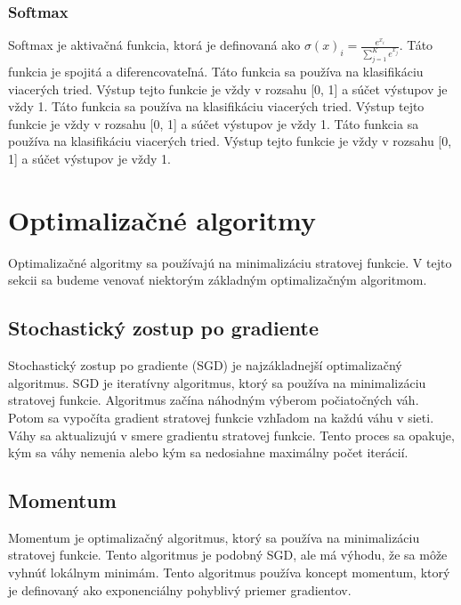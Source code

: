 \subsubsection{Softmax}\label{subsubsec:softmax}

Softmax je aktivačná funkcia, ktorá je definovaná ako $\sigma(x)_i = \frac{e^{x_i}}{\sum_{j=1}^{K} e^{x_j}}$. Táto funkcia je spojitá a diferencovateľná. Táto funkcia sa používa na klasifikáciu viacerých tried. Výstup tejto funkcie je vždy v rozsahu [0, 1] a súčet výstupov je vždy 1. Táto funkcia sa používa na klasifikáciu viacerých tried. Výstup tejto funkcie je vždy v rozsahu [0, 1] a súčet výstupov je vždy 1. Táto funkcia sa používa na klasifikáciu viacerých tried. Výstup tejto funkcie je vždy v rozsahu [0, 1] a súčet výstupov je vždy 1.

\section{Optimalizačné algoritmy}\label{sec:optimalizacne_algoritmy}

Optimalizačné algoritmy sa používajú na minimalizáciu stratovej funkcie. V tejto
sekcii sa budeme venovať niektorým základným optimalizačným algoritmom.

\subsection{Stochastický zostup po gradiente}\label{subsec:stochastic_gradient_descent}

Stochastický zostup po gradiente (SGD) je najzákladnejší optimalizačný algoritmus.
SGD je iteratívny algoritmus, ktorý sa používa na minimalizáciu stratovej funkcie.
Algoritmus začína náhodným výberom počiatočných váh. Potom sa vypočíta gradient
stratovej funkcie vzhľadom na každú váhu v sieti. Váhy sa aktualizujú v smere
gradientu stratovej funkcie. Tento proces sa opakuje, kým sa váhy nemenia alebo
kým sa nedosiahne maximálny počet iterácií.

\subsection{Momentum}\label{subsec:momentum}

Momentum je optimalizačný algoritmus, ktorý sa používa na minimalizáciu stratovej
funkcie. Tento algoritmus je podobný SGD, ale má výhodu, že sa môže vyhnúť lokálnym
minimám. Tento algoritmus používa koncept momentum, ktorý je definovaný ako
exponenciálny pohyblivý priemer gradientov. 

